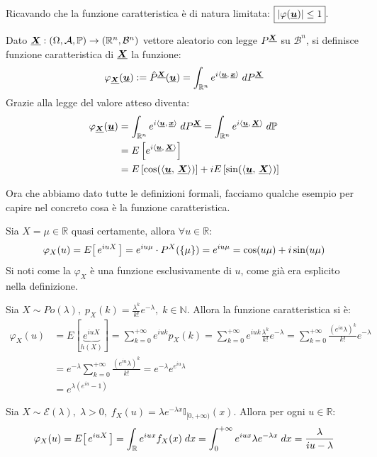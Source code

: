 Ricavando che la funzione caratteristica è di natura limitata: $\boxed{\left|\varphi(\underline{{\boldsymbol{u}}})\right|\leq 1}$.

\begin{definizione}
    Dato $\underline{{\boldsymbol{X}}}:(\Omega, \mathcal{A}, \mathbb{P})\to (\mathbb{R}^n, \mathcal{B}^n)$ vettore aleatorio con legge $P^{\underline{{\boldsymbol{X}}}}$ su $\mathcal{B}^n$, si definisce funzione caratteristica di $\underline{{\boldsymbol{X}}}$ la funzione:
    \[\varphi_{\underline{{\boldsymbol{X}}}}(\underline{{\boldsymbol{u}}}) := \hat{P}^{\underline{{\boldsymbol{X}}}}(\underline{{\boldsymbol{u}}}) = \int_{\mathbb{R}^n} e^{i\left\langle \underline{{\boldsymbol{u}}},\, \underline{{\boldsymbol{x}}} \right\rangle}\;dP^{\underline{{\boldsymbol{X}}}}\]
    Grazie alla legge del valore atteso diventa:
    \begin{align*}
    \varphi_{\underline{{\boldsymbol{X}}}}(\underline{{\boldsymbol{u}}}) & = \int_{\mathbb{R}^n} e^{i\left\langle \underline{{\boldsymbol{u}}},\, \underline{{\boldsymbol{x}}} \right\rangle}\;dP^{\underline{{\boldsymbol{X}}}} = \int_{\mathbb{R}^n} e^{i\left\langle \underline{{\boldsymbol{u}}},\, \underline{{\boldsymbol{X}}} \right\rangle}\;d\mathbb{P}\\
    & = E\left[e^{i\left\langle \underline{{\boldsymbol{u}}},\, \underline{{\boldsymbol{X}}} \right\rangle}\right] \\ 
    & = E\left[\cos(\left\langle \underline{{\boldsymbol{u}}},\, \underline{{\boldsymbol{X}}} \right\rangle)\right] + i E\left[\sin(\left\langle \underline{{\boldsymbol{u}}},\, \underline{{\boldsymbol{X}}} \right\rangle)\right]
    \end{align*}
\end{definizione}

\bigskip
\noindent Ora che abbiamo dato tutte le definizioni formali, facciamo qualche esempio per capire nel concreto cosa è la funzione caratteristica.

\begin{esempio}
    Sia $X = \mu\in \mathbb{R}$ quasi certamente, allora $\forall u\in\mathbb{R}$:
    \[\varphi_X(u) = E\!\left[\,e^{iuX}\,\right] = e^{iu\mu}\cdot P^X(\{\mu\}) = e^{iu\mu} = \cos(u\mu) + i\sin(u\mu)\]
    Si noti come la $\varphi_X$ è una funzione esclusivamente di $u$, come già era esplicito nella definizione.
\end{esempio}
\begin{esempio}
    Sia $X\sim Po(\lambda), \; p_X(k) = \frac{\lambda^k}{k!}e^{-\lambda}, \;k\in\mathbb{N}$. Allora la funzione caratteristica si è:
    \begin{align*}
        \varphi_X(u) & = E[\underbrace{e^{iuX}}_{h(X)}] = \sum_{k=0}^{+\infty} e^{iuk} p_X(k) = \sum_{k=0}^{+\infty} e^{iuk} \frac{\lambda^k}{k!}e^{-\lambda} = \sum_{k=0}^{+\infty} \frac{(e^{iu}\lambda)^k}{k!} e^{-\lambda} \\ 
        & = e^{-\lambda} \sum_{k=0}^{+\infty}\frac{(e^{iu}\lambda)^k}{k!} = e^{-\lambda} e^{e^{iu}\lambda}\\
        & = e^{\lambda(e^{iu}-1)}
    \end{align*}
\end{esempio}

\begin{esempio}
    Sia $X\sim \mathcal{E}(\lambda), \;\lambda>0,\; f_X(u) = \lambda e^{-\lambda x}\mathbb{I}_{[0, +\infty)}(x)$. Allora per ogni $u\in\mathbb{R}:$
    \[\varphi_X(u) = E\!\left[\,e^{iuX}\,\right] = \int_\mathbb{R}e^{iux}f_X(x)\;dx = \int_0^{+\infty}e^{iux}\lambda e^{-\lambda x}\;dx = \frac{\lambda}{iu-\lambda}\]
\end{esempio}

